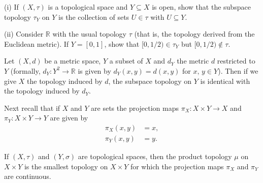\begin{problem}
(i) If $(X,\tau)$ is a topological space
and $Y\subseteq X$ is open,
show that the subspace topology $\tau_{Y}$ on $Y$
is the collection of sets $U\in\tau$ with $U\subseteq Y$.

(ii) Consider ${\mathbb R}$ with the usual topology $\tau$
(that is, the topology derived from the Euclidean metric).
If $Y=[0,1]$, show that $[0,1/2)\in\tau_{Y}$ but $[0,1/2)\notin\tau$.
\end{problem}
\begin{problem}
Let $(X,d)$ be a metric space, $Y$ a subset
of $X$ and $d_{Y}$ the metric $d$ restricted to $Y$
(formally, $d_{Y}:Y^{2}\rightarrow{\mathbb R}$ is given by
$d_{Y}(x,y)=d(x,y)$ for $x,\,y\in Y$). Then if we
give $X$ the topology induced by $d$, the subspace
topology on $Y$ is identical with the topology induced by $d_{Y}$.

\end{problem}
Next recall that if $X$ and $Y$ are sets
the projection maps $\pi_{X}:X\times Y\rightarrow X$ and
$\pi_{Y}:X\times Y\rightarrow Y$
are given by
\begin{align*}
\pi_{X}(x,y)&=x,\\
\pi_{Y}(x,y)&=y.
\end{align*}

\begin{definition}\label{D;product topology}
If $(X,\tau)$ and $(Y,\sigma)$
are topological spaces, then the product topology
$\mu$ on $X\times Y$ is
the smallest topology on $X\times Y$ for which the
projection maps $\pi_{X}$ and $\pi_{Y}$ are continuous.
\end{definition}




